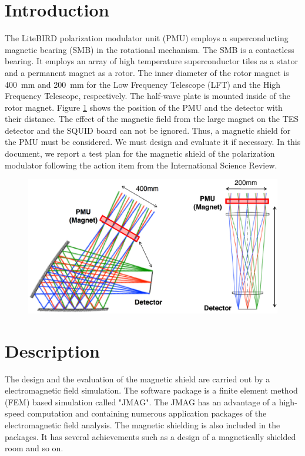 \documentclass[11pt]{article}
\begin{document}
\section*{Introduction}
The LiteBIRD polarization modulator unit (PMU) employs a superconducting magnetic bearing (SMB) in the rotational mechanism.
The SMB is a contactless bearing.%
It employs an array of high temperature superconductor tiles as a stator and a permanent magnet as a rotor.
The inner diameter of the rotor magnet is 400~mm and 200~mm for the Low Frequency Telescope (LFT) and the High Frequency Telescope, respectively.
The half-wave plate is mounted inside of the rotor magnet.
Figure \ref{fig:telescope} shows the position of the PMU and the detector with their distance.
The effect of the magnetic field from the large magnet on the TES detector and the SQUID board can not be ignored.
Thus, a magnetic shield for the PMU must be considered.
We must design and evaluate it if necessary.
In this document, we report a test plan for the magnetic shield of the polarization modulator following the action item from the International Science Review.

\begin{figure}[htbp]
  \centering
  \includegraphics[width=150mm]{figs/Telescope.eps}
  \caption{}
  \label{fig:telescope}
\end{figure}

\section*{Description}

The design and the evaluation of the magnetic shield are carried out by a electromagnetic field simulation.
The software package is a finite element method (FEM) based simulation called "JMAG".
The JMAG has an advantage of a high-speed computation and containing numerous application packages of the electromagnetic field analysis.
The magnetic shielding is also included in the packages.
It has several achievements such as a design of a magnetically shielded room and so on.
\end{document}
